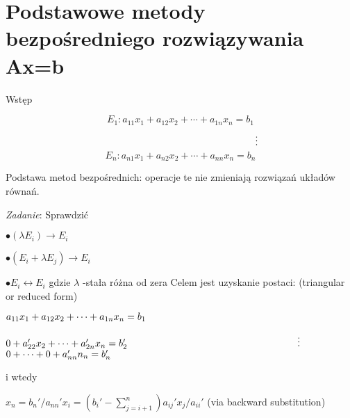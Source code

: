 \section{Podstawowe metody bezpośredniego rozwiązywania Ax=b}
	\begin{frame}{Wstęp}
\begin{exampleblock}{}
    $$
E_{1}:a_{11}x_{1}+a_{12}x_{2}+\cdots+a_{1n}x_{n}=b_{1}
$$
$$
\hspace{55.5mm} \vdots
$$
$$
E_{n}:a_{n1}x_{1}+a_{n2}x_{2}+\cdots+a_{nn}x_{n}=b_{n}
$$

 \end{exampleblock}
Podstawa metod bezpośrednich: operacje te nie zmieniają rozwiązań układów równań.
\begin{flushright}
{\it Zadanie}: Sprawdzić
\end{flushright} 
	\end{frame}
    \begin{frame}{}
    $\bullet(\lambda E_{i})\rightarrow E_{i}$

$\bullet(E_{i}+\lambda E_{j})\rightarrow E_{i}$

$\bullet E_{i}\leftrightarrow E_{i}$ \newline
gdzie $\lambda$ -stała różna od zera \newline
Celem jest uzyskanie postaci: (triangular or reduced form)
\begin{flushright}
$a_{11}x_{1}+a_{12}x_{2}+\cdots+a_{1n}x_{n}=b_{1} \linebreak$

$0+a_{22}'x_{2}+\cdots+a_{2n}'x_{n}=b_{2}'
 \linebreak$
$ \hspace{60mm} \vdots \linebreak$
$0+\cdots+0+a_{nn}'n_{n}=b_{n}' \linebreak$
\end{flushright}
$\mathrm{i}$ wtedy

$x_{n}=b_{n}'/a_{nn}' x_{i}=(b_{i}'-\displaystyle \sum_{j=i+1}^{n})a_{ij}'x_{j}/a_{ii}'$ (via backward substitution)
    \end{frame}
